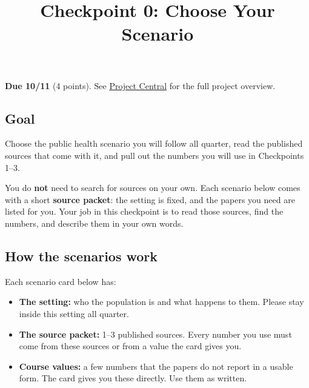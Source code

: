 \documentclass[
  letterpaper,
  DIV=11,
  numbers=noendperiod]{scrartcl}
\title{Checkpoint 0: Choose Your Scenario}
\author{}
\date{}
\providecommand{\tightlist}{%
  \setlength{\itemsep}{0pt}\setlength{\parskip}{0pt}}
\begin{document}
\maketitle


\begin{tcolorbox}[enhanced jigsaw, arc=.35mm, bottomrule=.15mm, bottomtitle=1mm, breakable, colback=white, colbacktitle=quarto-callout-important-color!10!white, colframe=quarto-callout-important-color-frame, coltitle=black, left=2mm, leftrule=.75mm, opacityback=0, opacitybacktitle=0.6, rightrule=.15mm, title=\textcolor{quarto-callout-important-color}{\faExclamation}\hspace{0.5em}{Important}, titlerule=0mm, toprule=.15mm, toptitle=1mm]

\textbf{Due 10/11} (4 points). See \href{../project.qmd}{Project
Central} for the full project overview.

\end{tcolorbox}

\subsection{Goal}\label{goal}

Choose the public health scenario you will follow all quarter, read the
published sources that come with it, and pull out the numbers you will
use in Checkpoints 1--3.

You do \textbf{not} need to search for sources on your own. Each
scenario below comes with a short \textbf{source packet}: the setting is
fixed, and the papers you need are listed for you. Your job in this
checkpoint is to read those sources, find the numbers, and describe them
in your own words.

\subsection{How the scenarios work}\label{how-the-scenarios-work}

Each scenario card below has:

\begin{itemize}
\tightlist
\item
  \textbf{The setting:} who the population is and what happens to them.
  Please stay inside this setting all quarter.
\item
  \textbf{The source packet:} 1--3 published sources. Every number you
  use must come from these sources or from a value the card gives you.
\item
  \textbf{Course values:} a few numbers that the papers do not report in
  a usable form. The card gives you these directly. Use them as written.
\end{itemize}
\end{document}
